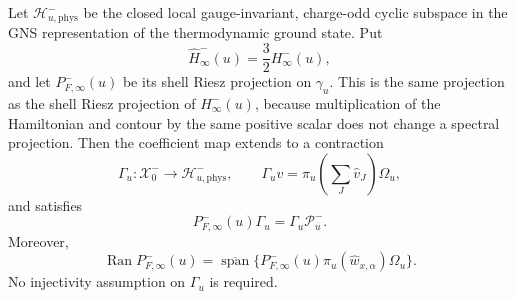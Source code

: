 \begin{lemma}
\label{lem:g18-cmp1-gns-transport-complete}
 Let $\mathcal H_{u,\mathrm{phys}}^-$ be the closed local gauge-invariant,
 charge-odd cyclic subspace in the GNS representation of the thermodynamic
 ground state.  Put
 \begin{equation}
  \widehat H_\infty^-(u)=\frac32H_\infty^-(u),
  \label{eq:g18-cmp1-rescaled-H-infty}
 \end{equation}
 and let $P_{F,\infty}^-(u)$ be its shell Riesz projection on
 $\gamma_u$.  This is the same projection as the shell Riesz projection of
 $H_\infty^-(u)$, because multiplication of the Hamiltonian and contour by
 the same positive scalar does not change a spectral projection.
Then the coefficient map extends to a contraction
\begin{equation}
 \Gamma_u:\mathcal X_0^-\longrightarrow
 \mathcal H_{u,\mathrm{phys}}^-,
 \qquad
 \Gamma_uv=\pi_u\!\left(\sum_J\widehat v_J\right)\Omega_u,
 \label{eq:g18-cmp1-Gamma}
\end{equation}
and satisfies
\begin{equation}
 P_{F,\infty}^-(u)\Gamma_u
 =\Gamma_u\mathcal P_u^-.
 \label{eq:g18-cmp1-riesz-intertwining}
\end{equation}
Moreover,
\begin{equation}
 \operatorname{Ran}P_{F,\infty}^-(u)
 =\overline{\operatorname{span}}
 \{P_{F,\infty}^-(u)
       \pi_u(\widehat w_{x,\alpha})\Omega_u\}.
 \label{eq:g18-cmp1-gns-totality}
\end{equation}
No injectivity assumption on $\Gamma_u$ is required.
\end{lemma}

